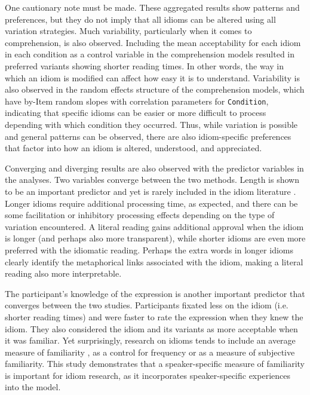 \documentclass[output=paper,modfonts,nonflat]{langsci/langscibook}
\begin{document}
One cautionary note must be made. These aggregated results show patterns and preferences, but they do not imply that all idioms can be altered using all variation strategies. Much variability, particularly when it comes to comprehension, is also observed. Including the mean acceptability for each idiom in each condition as a control variable in the comprehension models resulted in preferred variants showing shorter reading times. In other words, the way in which an idiom is modified can affect how easy it is to understand. Variability is also observed in the random effects structure of the comprehension models, which have by-Item random slopes with correlation parameters for \texttt{Condition}, indicating that specific idioms can be easier or more difficult to process depending with which condition they occurred. Thus, while variation is possible and general patterns can be observed, there are also idiom-specific preferences that factor into how an idiom is altered, understood, and appreciated. 

   


Converging and diverging results  are also observed with the predictor variables in the analyses. Two variables converge between the two methods. Length is shown to be an important predictor and yet is rarely included in the idiom literature \citep[cf.][]{FanariEtAl2010}. Longer idioms require additional processing time, as expected, and there can be some facilitation or inhibitory processing effects depending on the type of variation encountered. A literal reading gains additional approval when the idiom is longer (and perhaps also more transparent), while shorter idioms are even more preferred with the idiomatic reading. Perhaps the extra words in longer idioms clearly identify the metaphorical links associated with the idiom, making a literal reading also more interpretable.

The participant's knowledge of the expression is another important predictor that converges between the two studies.  Participants fixated less on the idiom (i.e. shorter reading times) and were faster to rate the expression when they knew the idiom. They also considered the idiom and its variants as more acceptable when it was familiar. Yet surprisingly, research on idioms tends to include an average measure of familiarity \citep[cf.][]{TitoneConnine1994}, as a control for frequency or as a measure of subjective familiarity. This study demonstrates that a speaker-specific measure of familiarity is important for idiom research, as it incorporates speaker-specific experiences into the model.
\end{document}
